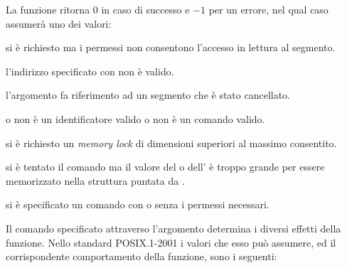 \begin{funcproto}{

}

{La funzione ritorna $0$ in caso di successo e $-1$ per un errore, nel qual
  caso  assumerà uno dei valori:
  \begin{errlist}
    \item[\errcode{EACCES}] si è richiesto  ma i permessi non
      consentono l'accesso in lettura al segmento.
    \item[\errcode{EFAULT}] l'indirizzo specificato con  non è
      valido.
    \item[\errcode{EIDRM}] l'argomento  fa riferimento ad un
      segmento che è stato cancellato.
    \item[\errcode{EINVAL}] o  non è un identificatore valido o
       non è un comando valido.
    \item[\errcode{ENOMEM}] si è richiesto un \textit{memory lock} di
      dimensioni superiori al massimo consentito.
    \item[\errcode{EOVERFLOW}] si è tentato il comando  ma il
      valore del  o dell' è troppo grande per essere
      memorizzato nella struttura puntata da .
    \item[\errcode{EPERM}] si è specificato un comando con  o
       senza i permessi necessari.
  \end{errlist}
}  
\end{funcproto}

Il comando specificato attraverso l'argomento  determina i diversi
effetti della funzione. Nello standard POSIX.1-2001 i valori che esso può
assumere, ed il corrispondente comportamento della funzione, sono i seguenti:

